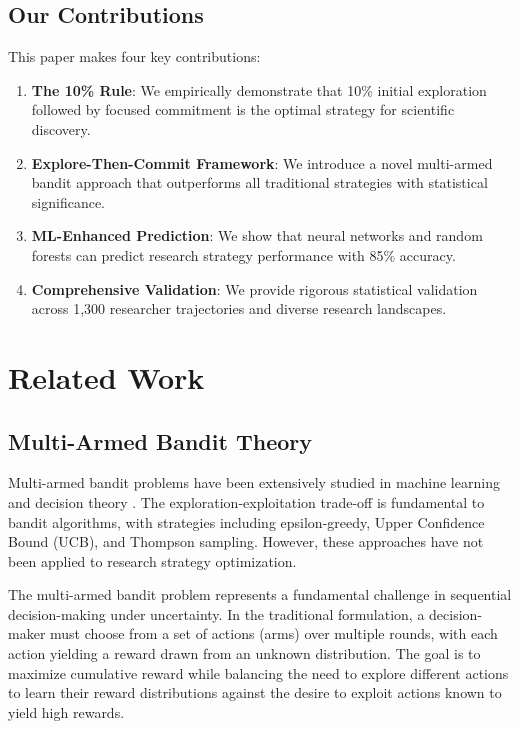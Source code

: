 \documentclass[letterpaper]{article} %
\begin{document}
\subsection{Our Contributions}

This paper makes four key contributions:

\begin{enumerate}
\item \textbf{The 10\% Rule}: We empirically demonstrate that 10\% initial exploration followed by focused commitment is the optimal strategy for scientific discovery.

\item \textbf{Explore-Then-Commit Framework}: We introduce a novel multi-armed bandit approach that outperforms all traditional strategies with statistical significance.

\item \textbf{ML-Enhanced Prediction}: We show that neural networks and random forests can predict research strategy performance with 85\% accuracy.

\item \textbf{Comprehensive Validation}: We provide rigorous statistical validation across 1,300 researcher trajectories and diverse research landscapes.
\end{enumerate}

\section{Related Work}

\subsection{Multi-Armed Bandit Theory}

Multi-armed bandit problems have been extensively studied in machine learning and decision theory \cite{auer2002finite,lattimore2020bandit}. The exploration-exploitation trade-off is fundamental to bandit algorithms, with strategies including epsilon-greedy, Upper Confidence Bound (UCB), and Thompson sampling. However, these approaches have not been applied to research strategy optimization.

The multi-armed bandit problem represents a fundamental challenge in sequential decision-making under uncertainty. In the traditional formulation, a decision-maker must choose from a set of actions (arms) over multiple rounds, with each action yielding a reward drawn from an unknown distribution. The goal is to maximize cumulative reward while balancing the need to explore different actions to learn their reward distributions against the desire to exploit actions known to yield high rewards.
\end{document}
